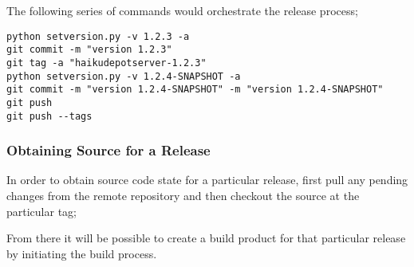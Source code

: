 The following series of commands would orchestrate the release process;

\begin{verbatim}
python setversion.py -v 1.2.3 -a
git commit -m "version 1.2.3"
git tag -a "haikudepotserver-1.2.3"
python setversion.py -v 1.2.4-SNAPSHOT -a
git commit -m "version 1.2.4-SNAPSHOT" -m "version 1.2.4-SNAPSHOT"
git push
git push --tags
\end{verbatim}

\subsubsection{Obtaining Source for a Release}

In order to obtain source code state for a particular release, first pull any pending changes from the remote repository and then checkout the source at the particular tag;


From there it will be possible to create a build product for that particular release by initiating the build process.